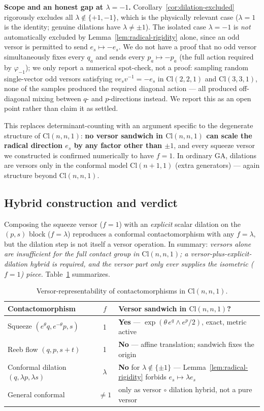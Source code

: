 \documentclass[11pt]{article}
\newcommand{\Cl}{\mathrm{Cl}}
\begin{document}
\textbf{Scope and an honest gap at $\lambda=-1$.} Corollary~\ref{cor:dilation-excluded} rigorously excludes all $\lambda\notin\{+1,-1\}$, which is the physically relevant case ($\lambda=1$ is the identity; genuine dilations have $\lambda\ne\pm1$). The isolated case $\lambda=-1$ is \emph{not} automatically excluded by Lemma~\ref{lem:radical-rigidity} alone, since an odd versor is permitted to send $e_s\mapsto -e_s$. We do not have a proof that no odd versor simultaneously fixes every $q_a$ and sends every $p_a\mapsto -p_a$ (the full action required by $\varphi_{-1}$); we only report a numerical spot-check, not a proof: sampling random single-vector odd versors satisfying $ve_sv^{-1}=-e_s$ in $\Cl(2,2,1)$ and $\Cl(3,3,1)$, none of the samples produced the required diagonal action — all produced off-diagonal mixing between $q$- and $p$-directions instead. We report this as an open point rather than claim it as settled.

This replaces determinant-counting with an argument specific to the degenerate structure of $\Cl(n,n,1)$: \textbf{no versor sandwich in $\Cl(n,n,1)$ can scale the radical direction $e_s$ by any factor other than $\pm1$}, and every squeeze versor we constructed is confirmed numerically to have $f=1$. In ordinary GA, dilations are versors only in the conformal model $\Cl(n+1,1)$ (extra generators) — again structure beyond $\Cl(n,n,1)$.

\subsection{Hybrid construction and verdict}

Composing the squeeze versor ($f=1$) with an \emph{explicit} scalar dilation on the $(p,s)$ block ($f=\lambda$) reproduces a conformal contactomorphism with any $f=\lambda$, but the dilation step is not itself a versor operation. In summary: \emph{versors alone are insufficient for the full contact group in $\Cl(n,n,1)$; a versor-plus-explicit-dilation hybrid is required, and the versor part only ever supplies the isometric ($f=1$) piece.} Table~\ref{tab:versor-verdict} summarizes.

\begin{table}[h]
\centering
\begin{tabular}{@{}lcl@{}}
\toprule
Contactomorphism & $f$ & Versor sandwich in $\Cl(n,n,1)$? \\
\midrule
Squeeze $(e^\theta q,e^{-\theta}p,s)$ & 1 & \textbf{Yes} — $\exp(\theta\,e^q\wedge e^p/2)$, exact, metric active \\
Reeb flow $(q,p,s+t)$ & 1 & \textbf{No} — affine translation; sandwich fixes the origin \\
Conformal dilation $(q,\lambda p,\lambda s)$ & $\lambda$ & \textbf{No} for $\lambda\notin\{\pm1\}$ — Lemma~\ref{lem:radical-rigidity} forbids $e_s\mapsto\lambda e_s$ \\
General conformal & $\ne1$ & only as versor $\circ$ dilation hybrid, not a pure versor \\
\bottomrule
\end{tabular}
\caption{Versor-representability of contactomorphisms in $\Cl(n,n,1)$.}
\label{tab:versor-verdict}
\end{table}
\end{document}
